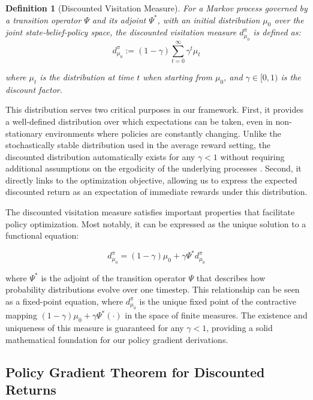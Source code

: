 \documentclass[a4paper,12pt]{report}
\newtheorem{definition}{Definition}
\begin{document}
\begin{definition}[Discounted Visitation Measure]
    For a Markov process governed by a transition operator $\Psi$ and its adjoint $\Psi^*$, with an initial distribution $\mu_0$ over the joint state-belief-policy space, the discounted visitation measure $d^{\pi}_{\mu_0}$ is defined as:
    \begin{equation}
        d^{\pi}_{\mu_0} := (1-\gamma) \sum_{t=0}^{\infty} \gamma^t \mu_t
    \end{equation}

    where $\mu_t$ is the distribution at time $t$ when starting from $\mu_0$, and $\gamma \in [0, 1)$ is the discount factor.
\end{definition}

This distribution serves two critical purposes in our framework. First, it provides a well-defined distribution over which expectations can be taken, even in non-stationary environments where policies are constantly changing. Unlike the stochastically stable distribution used in the average reward setting, the discounted distribution automatically exists for any $\gamma < 1$ without requiring additional assumptions on the ergodicity of the underlying processes \citep{puterman1994markov}. Second, it directly links to the optimization objective, allowing us to express the expected discounted return as an expectation of immediate rewards under this distribution.

The discounted visitation measure satisfies important properties that facilitate policy optimization. Most notably, it can be expressed as the unique solution to a functional equation:

\begin{equation}
    d^{\pi}_{\mu_0} = (1-\gamma)\mu_0 + \gamma \Psi^* d^{\pi}_{\mu_0}
\end{equation}


where $\Psi^*$ is the adjoint of the transition operator $\Psi$ that describes how probability distributions evolve over one timestep. This relationship can be seen as a fixed-point equation, where $d^{\pi}_{\mu_0}$ is the unique fixed point of the contractive mapping $(1-\gamma)\mu_0 + \gamma \Psi^*(\cdot)$ in the space of finite measures. The existence and uniqueness of this measure is guaranteed for any $\gamma < 1$, providing a solid mathematical foundation for our policy gradient derivations.

\subsection{Policy Gradient Theorem for Discounted Returns}
\end{document}
